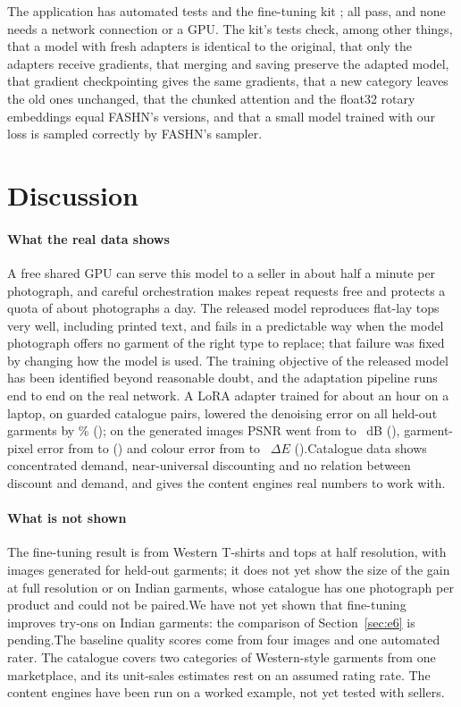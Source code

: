 The application has \vTestsApp{} automated tests and the fine-tuning kit \vTestsMl{}; all pass, and none needs a network connection or a GPU. The kit's tests check, among other things, that a model with fresh adapters is identical to the original, that only the adapters receive gradients, that merging and saving preserve the adapted model, that gradient checkpointing gives the same gradients, that a new category leaves the old ones unchanged, that the chunked attention and the float32 rotary embeddings equal FASHN's versions, and that a small model trained with our loss is sampled correctly by FASHN's sampler.

\section{Discussion}

\paragraph{What the real data shows} A free shared GPU can serve this model to a seller in about half a minute per photograph, and careful orchestration makes repeat requests free and protects a quota of about \vRunsLimit{} photographs a day. The released model reproduces flat-lay tops very well, including printed text, and fails in a predictable way when the model photograph offers no garment of the right type to replace; that failure was fixed by changing how the model is used. The training objective of the released model has been identified beyond reasonable doubt, and the adaptation pipeline runs end to end on the real network. \ifLora A LoRA adapter trained for about an hour on a laptop, on \vPairsTrain{} guarded catalogue pairs, lowered the denoising error on all \vLcN{} held-out garments by \vLcDlRel{}\% (\vLcDlVerdict{}); on the generated images PSNR went from \vLcPsnrBase{} to \vLcPsnrLora{}~dB (\vLcPsnrVerdict{}), garment-pixel error from \vLcGlBase{} to \vLcGlLora{} (\vLcGlVerdict{}) and colour error from \vLcCdBase{} to \vLcCdLora{}~$\Delta E$ (\vLcCdVerdict{}).\fi Catalogue data shows concentrated demand, near-universal discounting and no relation between discount and demand, and gives the content engines real numbers to work with.

\paragraph{What is not shown} \ifLora The fine-tuning result is from Western T-shirts and tops at half resolution, with images generated for \vLcGen{} held-out garments; it does not yet show the size of the gain at full resolution or on Indian garments, whose catalogue has one photograph per product and could not be paired.\else We have not yet shown that fine-tuning improves try-ons on Indian garments: the comparison of Section~\ref{sec:e6} is pending.\fi The baseline quality scores come from four images and one automated rater. The catalogue covers two categories of Western-style garments from one marketplace, and its unit-sales estimates rest on an assumed rating rate. The content engines have been run on a worked example, not yet tested with sellers.


